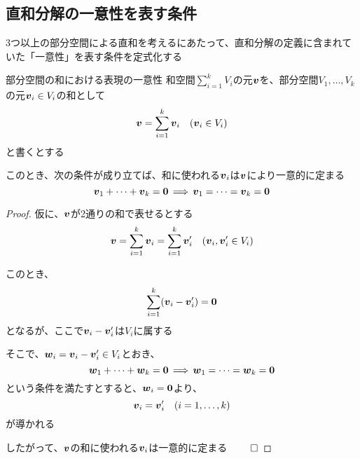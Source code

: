 \documentclass[../../../topic_linear-algebra]{subfiles}
\begin{document}
\subsection{直和分解の一意性を表す条件}

3つ以上の部分空間による直和を考えるにあたって、直和分解の定義に含まれていた「一意性」を表す条件を定式化する

\begin{theorem}{部分空間の和における表現の一意性}
  和空間$\sum_{i=1}^k V_i$の元$\vb*{v}$を、部分空間$V_1, \ldots, V_k$の元$\vb*{v}_i \in V_i$の和として
  \begin{equation*}
    \vb*{v} = \sum_{i=1}^k \vb*{v}_i \quad (\vb*{v}_i \in V_i)
  \end{equation*}
  と書くとする

  このとき、次の条件が成り立てば、和に使われる$\vb*{v}_i$は$\vb*{v}$により一意的に定まる
  \begin{equation*}
    \vb*{v}_1 + \cdots + \vb*{v}_k = \vb*{0} \, \Longrightarrow \, \vb*{v}_1 = \cdots = \vb*{v}_k = \vb*{0}
  \end{equation*}
\end{theorem}

\begin{proof}
  仮に、$\vb*{v}$が2通りの和で表せるとする
  \begin{equation*}
    \vb*{v} = \sum_{i=1}^k \vb*{v}_i = \sum_{i=1}^k \vb*{v}_i' \quad (\vb*{v}_i, \vb*{v}_i' \in V_i)
  \end{equation*}

  このとき、
  \begin{equation*}
    \sum_{i=1}^k (\vb*{v}_i - \vb*{v}_i') = \vb*{0}
  \end{equation*}
  となるが、ここで$\vb*{v}_i - \vb*{v}_i'$は$V_i$に属する

  \br

  そこで、$\vb*{w}_i = \vb*{v}_i - \vb*{v}_i' \in V_i$とおき、
  \begin{equation*}
    \vb*{w}_1 + \cdots + \vb*{w}_k = \vb*{0} \, \Longrightarrow \, \vb*{w}_1 = \cdots = \vb*{w}_k = \vb*{0}
  \end{equation*}
  という条件を満たすとすると、$\vb*{w}_i = \vb*{0}$より、
  \begin{equation*}
    \vb*{v}_i = \vb*{v}_i' \quad (i=1,\ldots,k)
  \end{equation*}
  が導かれる

  したがって、$\vb*{v}$の和に使われる$\vb*{v}_i$は一意的に定まる $\qed$
\end{proof}
\end{document}
